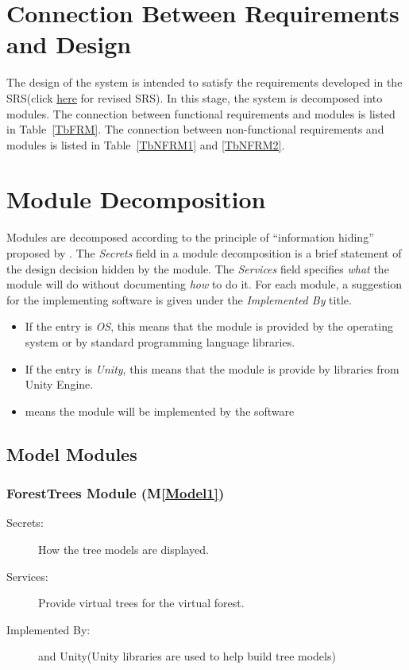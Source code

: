 \documentclass[12pt, titlepage]{article}
\newcommand{\mref}[1]{M\ref{#1}}
\begin{document}
\newpage

\section{Connection Between Requirements and Design} \label{SecConnection}

The design of the system is intended to satisfy the requirements developed in
the SRS(click \href{https://github.com/wuj187/DigitalTwinCAS/blob/main/docs/DocRevision/SRSRevision/SRSRevision.pdf}{here} for revised SRS). In this stage, the system is decomposed into modules. The connection
between functional requirements and modules is listed in Table~\ref{TbFRM}. 
The connection
between non-functional requirements and modules is listed in Table~\ref{TbNFRM1} and \ref{TbNFRM2}.

\section{Module Decomposition} \label{SecMD}

Modules are decomposed according to the principle of ``information hiding''
proposed by \citet{ParnasEtAl1984}. The \emph{Secrets} field in a module
decomposition is a brief statement of the design decision hidden by the
module. The \emph{Services} field specifies \emph{what} the module will do
without documenting \emph{how} to do it. For each module, a suggestion for the
implementing software is given under the \emph{Implemented By} title. 

\begin{itemize}
\item If the
entry is \emph{OS}, this means that the module is provided by the operating
system or by standard programming language libraries. 

\item If the entry is \emph{Unity}, this means that the module is provide by libraries from
Unity Engine.

\item \emph{\progname{}} means the
module will be implemented by the \progname{} software
\end{itemize}

\subsection{Model Modules}

\subsubsection{ForestTrees Module (\mref{Model1})}
\begin{description}
\item[Secrets:] How the tree models are displayed.
\item[Services:] Provide virtual trees for the virtual forest.
\item[Implemented By:] \progname{} and Unity(Unity libraries are used to help build tree
models)
\end{description}
\end{document}
